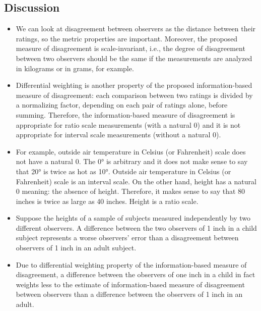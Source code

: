 \documentclass[12pt, a4paper]{report}
\theoremstyle{plain}
\theoremstyle{definition}
\theoremstyle{remark}
\begin{document}
	
	\subsection{Discussion}
	
	\begin{itemize}
		\item We can look at disagreement between observers as the distance between their ratings, so the metric properties are important. Moreover, the proposed measure of disagreement is scale-invariant, i.e., the degree of disagreement between two observers should be the same if the measurements are analyzed in kilograms or in grams, for example.
		
		\item Differential weighting is another property of the proposed information-based measure of disagreement: each comparison between two ratings is divided by a normalizing factor, depending on each pair of ratings alone, before summing. Therefore, the information-based measure of disagreement is appropriate for ratio scale measurements (with a natural 0) and it is not appropriate for interval scale measurements (without a natural 0). 
		
		\item For example, outside air temperature in Celsius (or Fahrenheit) scale does not have a natural 0. The 0° is arbitrary and it does not make sense to say that 20° is twice as hot as 10°. Outside air temperature in Celsius (or Fahrenheit) scale is an interval scale. On the other hand, height has a natural 0 meaning: the absence of height. Therefore, it makes sense to say that 80 inches is twice as large as 40 inches. Height is a ratio scale. 
		
		\item Suppose the heights of a sample of subjects measured independently by two different observers. A difference between the two observers of 1 inch in a child subject represents a worse observers' error than a disagreement between observers of 1 inch in an adult subject. 
		
		\item Due to differential weighting property of the information-based measure of disagreement, a difference between the observers of one inch in a child in fact weights less to the estimate of information-based measure of disagreement between observers than a difference between the observers of 1 inch in an adult.
		

\end{itemize}
\end{document}
